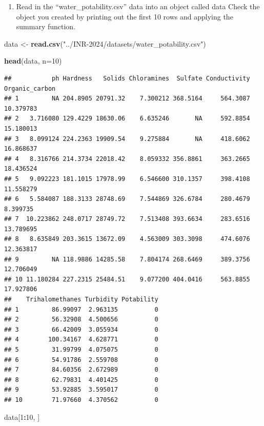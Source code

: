 \documentclass[
]{book}
\newenvironment{Shaded}{\begin{snugshade}}{\end{snugshade}}
\newcommand{\AttributeTok}[1]{\textcolor[rgb]{0.13,0.29,0.53}{#1}}
\newcommand{\DecValTok}[1]{\textcolor[rgb]{0.00,0.00,0.81}{#1}}
\newcommand{\FunctionTok}[1]{\textcolor[rgb]{0.13,0.29,0.53}{\textbf{#1}}}
\newcommand{\NormalTok}[1]{#1}
\newcommand{\OtherTok}[1]{\textcolor[rgb]{0.56,0.35,0.01}{#1}}
\newcommand{\SpecialCharTok}[1]{\textcolor[rgb]{0.81,0.36,0.00}{\textbf{#1}}}
\newcommand{\StringTok}[1]{\textcolor[rgb]{0.31,0.60,0.02}{#1}}
\providecommand{\tightlist}{%
  \setlength{\itemsep}{0pt}\setlength{\parskip}{0pt}}
\begin{document}
\begin{enumerate}
\def\labelenumi{\arabic{enumi}.}
\tightlist
\item
  Read in the ``water\_potability.csv'' data into an object called data Check the object you created by printing out the first 10 rows and applying the summary function.
\end{enumerate}

\begin{Shaded}
\begin{Highlighting}[]
\NormalTok{data }\OtherTok{\textless{}{-}} \FunctionTok{read.csv}\NormalTok{(}\StringTok{"../INR{-}2024/datasets/water\_potability.csv"}\NormalTok{)}

\FunctionTok{head}\NormalTok{(data, }\AttributeTok{n=}\DecValTok{10}\NormalTok{)}
\end{Highlighting}
\end{Shaded}

\begin{verbatim}
##           ph Hardness   Solids Chloramines  Sulfate Conductivity Organic_carbon
## 1         NA 204.8905 20791.32    7.300212 368.5164     564.3087      10.379783
## 2   3.716080 129.4229 18630.06    6.635246       NA     592.8854      15.180013
## 3   8.099124 224.2363 19909.54    9.275884       NA     418.6062      16.868637
## 4   8.316766 214.3734 22018.42    8.059332 356.8861     363.2665      18.436524
## 5   9.092223 181.1015 17978.99    6.546600 310.1357     398.4108      11.558279
## 6   5.584087 188.3133 28748.69    7.544869 326.6784     280.4679       8.399735
## 7  10.223862 248.0717 28749.72    7.513408 393.6634     283.6516      13.789695
## 8   8.635849 203.3615 13672.09    4.563009 303.3098     474.6076      12.363817
## 9         NA 118.9886 14285.58    7.804174 268.6469     389.3756      12.706049
## 10 11.180284 227.2315 25484.51    9.077200 404.0416     563.8855      17.927806
##    Trihalomethanes Turbidity Potability
## 1         86.99097  2.963135          0
## 2         56.32908  4.500656          0
## 3         66.42009  3.055934          0
## 4        100.34167  4.628771          0
## 5         31.99799  4.075075          0
## 6         54.91786  2.559708          0
## 7         84.60356  2.672989          0
## 8         62.79831  4.401425          0
## 9         53.92885  3.595017          0
## 10        71.97660  4.370562          0
\end{verbatim}

\begin{Shaded}
\begin{Highlighting}[]
\NormalTok{data[}\DecValTok{1}\SpecialCharTok{:}\DecValTok{10}\NormalTok{, ]}
\end{Highlighting}
\end{Shaded}
\end{document}
